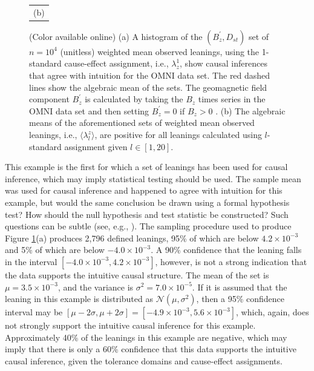\documentclass[twocolumn,aps,pre,groupedaddress]{revtex4-1}
\begin{document}
\begin{figure}[ht]
\begin{tabular}{c}
(b) 
\end{tabular}
\caption{(Color available online) (a) A histogram of the $(B_z^\prime,D_{st})$ set of $n=10^4$ (unitless) weighted mean observed leanings, using the 1-standard cause-effect assignment, i.e., $\lambda^1_{z}$, show causal inferences that agree with intuition for the OMNI data set.  The red dashed lines show the algebraic mean of the sets.  The geomagnetic field component $B_z^\prime$ is calculated by taking the $B_z$ times series in the OMNI data set and then setting $B_z^\prime = 0$ if $B_z>0$ \cite{Burton1975,Dungey1961}. (b) The algebraic means of the aforementioned sets of weighted mean observed leanings, i.e., $\langle\lambda^z_l\rangle$, are positive for all leanings calculated using $l$-standard assignment given $l\in[1,20]$.}
\label{fig:dsthist}
\end{figure}

This example is the first for which a set of leanings has been used for causal inference, which may imply statistical testing should be used.  The sample mean was used for causal inference and happened to agree with intuition for this example, but would the same conclusion be drawn using a formal hypothesis test?  How should the null hypothesis and test statistic be constructed?  Such questions can be subtle (see, e.g., \cite{Rubin2015}).  The sampling procedure used to produce Figure \ref{fig:dsthist}(a) produces 2,796 defined leanings, 95\% of which are below $4.2\times 10^{-3}$ and 5\% of which are below $-4.0\times 10^{-3}$.  A 90\% confidence that the leaning falls in the interval $[-4.0\times 10^{-3},4.2\times10^{-3}]$, however, is not a strong indication that the data supports the intuitive causal structure.  The mean of the set is $\mu = 3.5\times 10^{-3}$, and the variance is $\sigma^2 = 7.0\times 10^{-5}$.  If it is assumed that the leaning in this example is distributed as $\mathcal{N}(\mu,\sigma^2)$, then a 95\% confidence interval may be $[\mu-2\sigma,\mu+2\sigma]=[-4.9\times 10^{-3},5.6\times 10^{-3}]$, which, again, does not strongly support the intuitive causal inference for this example.  Approximately 40\% of the leanings in this example are negative, which may imply that there is only a 60\% confidence that this data supports the intuitive causal inference, given the tolerance domains and cause-effect assignments.  
\end{document}
